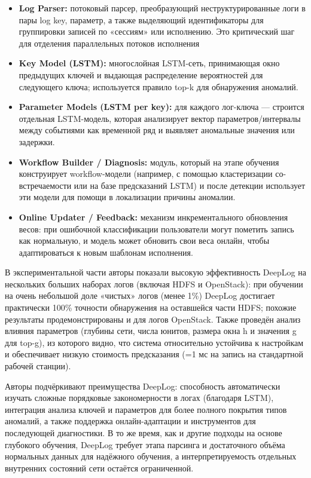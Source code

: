 \begin{itemize}
    \item \textbf{Log Parser:} потоковый парсер, преобразующий неструктурированные логи в пары {log key, параметр}, а также выделяющий идентификаторы для группировки записей по «сессиям» или исполнению. Это критический шаг для отделения параллельных потоков исполнения
    \item \textbf{Key Model (LSTM):} многослойная LSTM-сеть, принимающая окно предыдущих ключей и выдающая распределение вероятностей для следующего ключа; используется правило top-k для обнаружения аномалий.
    \item \textbf{Parameter Models (LSTM per key):} для каждого лог-ключа — строится отдельная LSTM-модель, которая анализирует вектор параметров/интервалы между событиями как временной ряд и выявляет аномальные значения или задержки.
    \item \textbf{Workflow Builder / Diagnosis:} модуль, который на этапе обучения конструирует workflow-модели (например, с помощью кластеризации со-встречаемости или на базе предсказаний LSTM) и после детекции использует эти модели для помощи в локализации причины аномалии.
    \item \textbf{Online Updater / Feedback:} механизм инкрементального обновления весов: при ошибочной классификации пользователи могут пометить запись как нормальную, и модель может обновить свои веса онлайн, чтобы адаптироваться к новым шаблонам исполнения.
\end{itemize}

В экспериментальной части авторы показали высокую эффективность DeepLog на нескольких больших наборах логов (включая HDFS и OpenStack): при обучении на очень небольшой доле «чистых» логов (менее 1\%) DeepLog достигает практически 100\% точности обнаружения на оставшейся части HDFS; похожие результаты продемонстрированы и для логов OpenStack. Также проведён анализ влияния параметров (глубины сети, числа юнитов, размера окна h и значения g для top-g), из которого видно, что система относительно устойчива к настройкам и обеспечивает низкую стоимость предсказания (=1 мс на запись на стандартной рабочей станции).

Авторы подчёркивают преимущества DeepLog: способность автоматически изучать сложные порядковые закономерности в логах (благодаря LSTM), интеграция анализа ключей и параметров для более полного покрытия типов аномалий, а также поддержка онлайн-адаптации и инструментов для последующей диагностики. В то же время, как и другие подходы на основе глубокого обучения, DeepLog требует этапа парсинга и достаточного объёма нормальных данных для надёжного обучения, а интерпретируемость отдельных внутренних состояний сети остаётся ограниченной.
